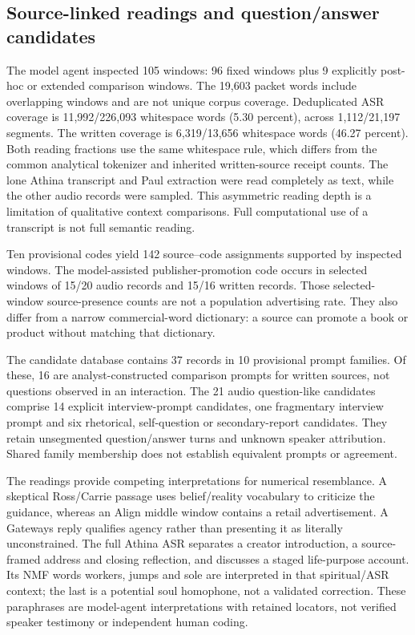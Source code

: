 \subsection{Source-linked readings and question/answer candidates}

The model agent inspected 105 windows: 96 fixed windows plus 9 explicitly post-hoc or extended comparison windows. The 19,603 packet words include overlapping windows and are not unique corpus coverage. Deduplicated ASR coverage is 11,992/226,093 whitespace words (5.30 percent), across 1,112/21,197 segments. The written coverage is 6,319/13,656 whitespace words (46.27 percent). Both reading fractions use the same whitespace rule, which differs from the common analytical tokenizer and inherited written-source receipt counts. The lone Athina transcript and Paul extraction were read completely as text, while the other audio records were sampled. This asymmetric reading depth is a limitation of qualitative context comparisons. Full computational use of a transcript is not full semantic reading.

Ten provisional codes yield 142 source--code assignments supported by inspected windows. The model-assisted publisher-promotion code occurs in selected windows of 15/20 audio records and 15/16 written records. Those selected-window source-presence counts are not a population advertising rate. They also differ from a narrow commercial-word dictionary: a source can promote a book or product without matching that dictionary.

The candidate database contains 37 records in 10 provisional prompt families. Of these, 16 are analyst-constructed comparison prompts for written sources, not questions observed in an interaction. The 21 audio question-like candidates comprise 14 explicit interview-prompt candidates, one fragmentary interview prompt and six rhetorical, self-question or secondary-report candidates. They retain unsegmented question/answer turns and unknown speaker attribution. Shared family membership does not establish equivalent prompts or agreement.

The readings provide competing interpretations for numerical resemblance. A skeptical Ross/Carrie passage uses belief/reality vocabulary to criticize the guidance, whereas an Align middle window contains a retail advertisement. A Gateways reply qualifies agency rather than presenting it as literally unconstrained. The full Athina ASR separates a creator introduction, a source-framed address and closing reflection, and discusses a staged life-purpose account. Its NMF words workers, jumps and sole are interpreted in that spiritual/ASR context; the last is a potential soul homophone, not a validated correction. These paraphrases are model-agent interpretations with retained locators, not verified speaker testimony or independent human coding.

